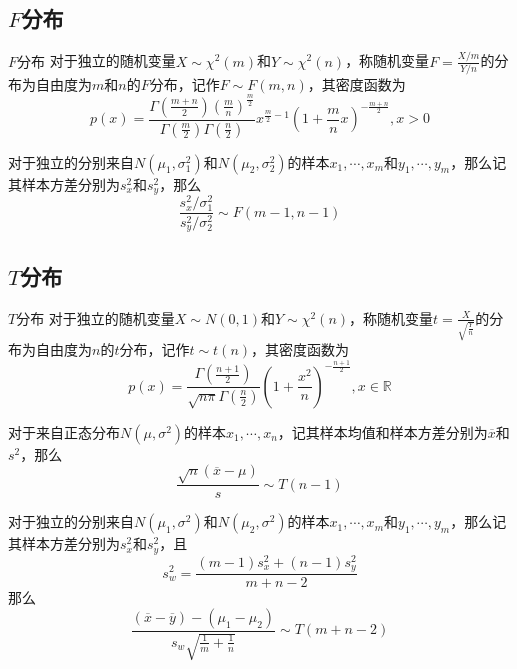 \documentclass[lang = cn, scheme = chinese, thmcnt = section]{elegantbook}
\newcommand{\R}{\mathbb{R}}            %
\begin{document}
\subsection{$F$分布}

\begin{definition}{$F$分布}
	对于独立的随机变量$X\sim\chi^2(m)$和$Y\sim\chi^2(n)$，称随机变量$F=\frac{X/m}{Y/n}$的分布为自由度为$m$和$n$的$F$分布，记作$F\sim F(m,n)$​，其密度函数为
	$$
	p(x)=\frac{\Gamma\left( \frac{m+n}{2} \right)\left( \frac{m}{n} \right)^{\frac{m}{2}}}{\Gamma\left( \frac{m}{2} \right)\Gamma\left( \frac{n}{2} \right)}x^{\frac{m}{2}-1}\left( 1+\frac{m}{n}x \right)^{-\frac{m+n}{2}},x>0
	$$
\end{definition}

\begin{corollary}
	对于独立的分别来自$N(\mu_1,\sigma^2_1)$和$N(\mu_2,\sigma^2_2)$的样本$x_1,\cdots,x_m$和$y_1,\cdots,y_m$，那么记其样本方差分别为$s_x^2$和$s_y^2$，那么
	$$
	\frac{s_x^2/\sigma^2_1}{s_y^2/\sigma^2_2}\sim F(m-1,n-1)
	$$
\end{corollary}

\subsection{$T$分布}

\begin{definition}{$T$分布}
	对于独立的随机变量$X\sim N(0,1)$和$Y\sim \chi^2(n)$，称随机变量$t=\frac{X}{\sqrt{\frac{Y}{n}}}$的分布为自由度为$n$的$t$分布，记作$t\sim t(n)$​，其密度函数为
	$$
	p(x)=\frac{\Gamma\left( \frac{n+1}{2} \right)}{\sqrt{n\pi}\Gamma\left( \frac{n}{2} \right)}\left( 1+\frac{x^2}{n} \right)^{-\frac{n+1}{2}},x\in\R
	$$
\end{definition}

\begin{corollary}
	对于来自正态分布$N(\mu,\sigma^2)$的样本$x_1,\cdots,x_n$，记其样本均值和样本方差分别为$\overline{x}$和$s^2$，那么
	$$
	\frac{\sqrt{n}(\overline{x}-\mu)}{s}\sim T(n-1)
	$$
\end{corollary}

\begin{corollary}
	对于独立的分别来自$N(\mu_1,\sigma^2)$和$N(\mu_2,\sigma^2)$的样本$x_1,\cdots,x_m$和$y_1,\cdots,y_m$，那么记其样本方差分别为$s_x^2$和$s_y^2$，且
	$$
	s_w^2=\frac{(m-1)s_x^2+(n-1)s_y^2}{m+n-2}
	$$
	那么
	$$
	\frac{(\overline{x}-\overline{y})-(\mu_1-\mu_2)}{s_w\sqrt{\frac{1}{m}+\frac{1}{n}}}\sim T(m+n-2)
	$$
\end{corollary}
\end{document}
